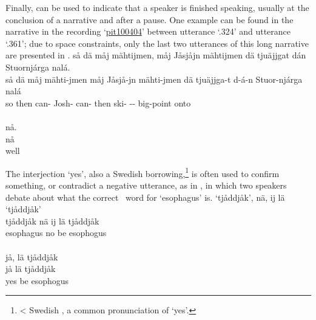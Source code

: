 Finally,  can be used to indicate that a speaker is finished speaking, usually at the conclusion of a narrative and after a pause. One example can be found in the narrative in the recording ‘\hyperlink{pit100404}{pit100404}’ between utterance ‘.324’ and utterance ‘.361’; due to space constraints, only the last two utterances of this long narrative are presented in . %
\ea\label{noEx1}
\glll	{} så dä måj mähtijmen, måj Jåsjåjn mähtijmen {\hspace{14pt}dä} tjuäjjgat dán Stuornjárga nalá.\\
	{} så dä måj mähti-jmen måj Jåsjå-jn mähti-jmen {\hspace{14pt}dä} tjuäjjga-t d-á-n Stuor-njárga nalá\\
	{} so then  can-  Josh- can- {\hspace{14pt}then} ski- -- big-point\BS{} onto\\\nopagebreak
{}\\	%
\glll	{} nå.\\
	{} nå\\
	{} well\\\nopagebreak
{}	
\z


The interjection  ‘yes’, also a Swedish borrowing,\footnote{< Swedish , a common pronunciation of  ‘yes’.} 
is often used to confirm something, or contradict a negative utterance, as in , in which two speakers debate about what the correct \PS\ word for ‘esophagus’ is. 
\ea\label{particleEx7}
\glll	{} ‘tjåddjåk’, nä, ij lä ‘tjåddjåk’\\
	{} tjåddjåk nä ij lä tjåddjåk\\
	{} esophagus\BS{} no \BS{} be\BS{} esophogus\BS{}\\\nopagebreak
{}\\
\glll	{} jå, lä tjåddjåk\\
	{} jå lä tjåddjåk\\
	{} yes be\BS{} esophogus\BS{}\\\nopagebreak
{}	
\z









%